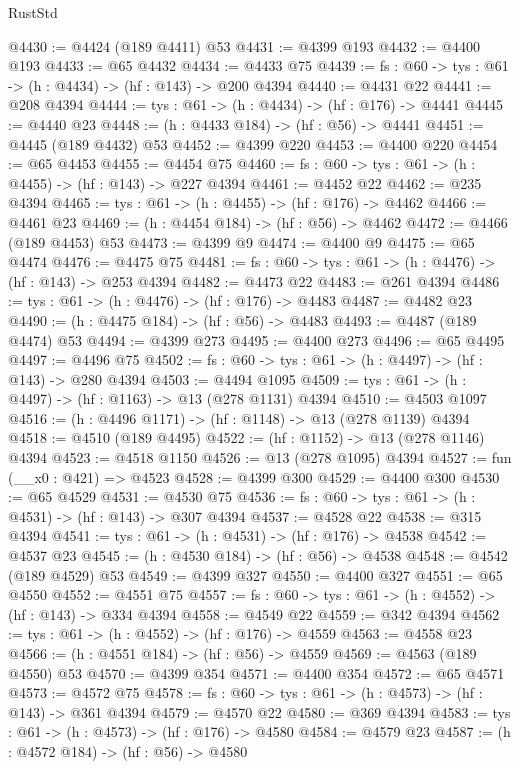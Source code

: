 \begin{lexlean}{RustStd}
\begin{coremodule}
@4430 := @4424 (@189 @4411) @53
@4431 := @4399 @193
@4432 := @4400 @193
@4433 := @65 @4432
@4434 := @4433 @75
@4439 := {fs : @60} -> {tys : @61} -> (h : @4434) -> (hf : @143) -> @200 @4394
@4440 := @4431 @22
@4441 := @208 @4394
@4444 := {tys : @61} -> (h : @4434) -> (hf : @176) -> @4441
@4445 := @4440 @23
@4448 := (h : @4433 @184) -> (hf : @56) -> @4441
@4451 := @4445 (@189 @4432) @53
@4452 := @4399 @220
@4453 := @4400 @220
@4454 := @65 @4453
@4455 := @4454 @75
@4460 := {fs : @60} -> {tys : @61} -> (h : @4455) -> (hf : @143) -> @227 @4394
@4461 := @4452 @22
@4462 := @235 @4394
@4465 := {tys : @61} -> (h : @4455) -> (hf : @176) -> @4462
@4466 := @4461 @23
@4469 := (h : @4454 @184) -> (hf : @56) -> @4462
@4472 := @4466 (@189 @4453) @53
@4473 := @4399 @9
@4474 := @4400 @9
@4475 := @65 @4474
@4476 := @4475 @75
@4481 := {fs : @60} -> {tys : @61} -> (h : @4476) -> (hf : @143) -> @253 @4394
@4482 := @4473 @22
@4483 := @261 @4394
@4486 := {tys : @61} -> (h : @4476) -> (hf : @176) -> @4483
@4487 := @4482 @23
@4490 := (h : @4475 @184) -> (hf : @56) -> @4483
@4493 := @4487 (@189 @4474) @53
@4494 := @4399 @273
@4495 := @4400 @273
@4496 := @65 @4495
@4497 := @4496 @75
@4502 := {fs : @60} -> {tys : @61} -> (h : @4497) -> (hf : @143) -> @280 @4394
@4503 := @4494 @1095
@4509 := {tys : @61} -> (h : @4497) -> (hf : @1163) -> @13 (@278 @1131) @4394
@4510 := @4503 @1097
@4516 := (h : @4496 @1171) -> (hf : @1148) -> @13 (@278 @1139) @4394
@4518 := @4510 (@189 @4495)
@4522 := (hf : @1152) -> @13 (@278 @1146) @4394
@4523 := @4518 @1150
@4526 := @13 (@278 @1095) @4394
@4527 := fun (__x0 : @421) => @4523
@4528 := @4399 @300
@4529 := @4400 @300
@4530 := @65 @4529
@4531 := @4530 @75
@4536 := {fs : @60} -> {tys : @61} -> (h : @4531) -> (hf : @143) -> @307 @4394
@4537 := @4528 @22
@4538 := @315 @4394
@4541 := {tys : @61} -> (h : @4531) -> (hf : @176) -> @4538
@4542 := @4537 @23
@4545 := (h : @4530 @184) -> (hf : @56) -> @4538
@4548 := @4542 (@189 @4529) @53
@4549 := @4399 @327
@4550 := @4400 @327
@4551 := @65 @4550
@4552 := @4551 @75
@4557 := {fs : @60} -> {tys : @61} -> (h : @4552) -> (hf : @143) -> @334 @4394
@4558 := @4549 @22
@4559 := @342 @4394
@4562 := {tys : @61} -> (h : @4552) -> (hf : @176) -> @4559
@4563 := @4558 @23
@4566 := (h : @4551 @184) -> (hf : @56) -> @4559
@4569 := @4563 (@189 @4550) @53
@4570 := @4399 @354
@4571 := @4400 @354
@4572 := @65 @4571
@4573 := @4572 @75
@4578 := {fs : @60} -> {tys : @61} -> (h : @4573) -> (hf : @143) -> @361 @4394
@4579 := @4570 @22
@4580 := @369 @4394
@4583 := {tys : @61} -> (h : @4573) -> (hf : @176) -> @4580
@4584 := @4579 @23
@4587 := (h : @4572 @184) -> (hf : @56) -> @4580

\end{coremodule}
\end{lexlean}
